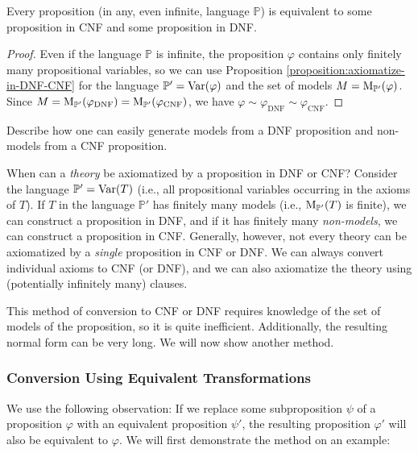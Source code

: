 \begin{corollary}
    Every proposition (in any, even infinite, language $\mathbb P$) is equivalent to some proposition in CNF and some proposition in DNF.
\end{corollary}
\begin{proof}
Even if the language $\mathbb P$ is infinite, the proposition $\varphi$ contains only finitely many propositional variables, so we can use Proposition \ref{proposition:axiomatize-in-DNF-CNF} for the language $\mathbb P' = \operatorname{Var}(\varphi)$ and the set of models $M = \operatorname{M}_{\mathbb P'}(\varphi)$. Since $M = \operatorname{M}_{\mathbb P'}(\varphi_{\mathrm{DNF}}) = \operatorname{M}_{\mathbb P'}(\varphi_{\mathrm{CNF}})$, we have $\varphi \sim \varphi_{\mathrm{DNF}} \sim \varphi_{\mathrm{CNF}}$.
\end{proof}

\begin{exercise}
Describe how one can easily generate models from a DNF proposition and non-models from a CNF proposition.
\end{exercise}

\begin{remark}
    When can a \emph{theory} be axiomatized by a proposition in DNF or CNF? Consider the language $\mathbb P' = \operatorname{Var}(T)$ (i.e., all propositional variables occurring in the axioms of $T$). If $T$ in the language $\mathbb P'$ has finitely many models (i.e., $\operatorname{M}_{\mathbb P'}(T)$ is finite), we can construct a proposition in DNF, and if it has finitely many \emph{non-models}, we can construct a proposition in CNF. Generally, however, not every theory can be axiomatized by a \emph{single} proposition in CNF or DNF. We can always convert individual axioms to CNF (or DNF), and we can also axiomatize the theory using (potentially infinitely many) clauses.
\end{remark}

This method of conversion to CNF or DNF requires knowledge of the set of models of the proposition, so it is quite inefficient. Additionally, the resulting normal form can be very long. We will now show another method.

\subsubsection{Conversion Using Equivalent Transformations}

We use the following observation: If we replace some subproposition $\psi$ of a proposition $\varphi$ with an equivalent proposition $\psi'$, the resulting proposition $\varphi'$ will also be equivalent to $\varphi$. We will first demonstrate the method on an example:


